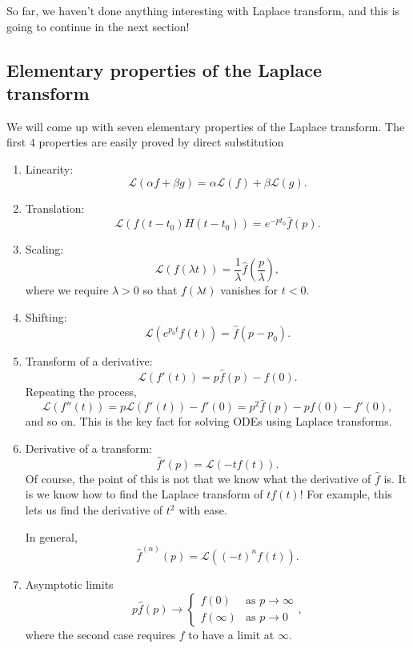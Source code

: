 \documentclass[a4paper]{article}
\begin{document}
So far, we haven't done anything interesting with Laplace transform, and this is going to continue in the next section!
\subsection{Elementary properties of the Laplace transform}
We will come up with seven elementary properties of the Laplace transform. The first $4$ properties are easily proved by direct substitution
\begin{prop}\leavevmode
  \begin{enumerate}
    \item Linearity:
      \[
        \mathcal{L}(\alpha f + \beta g) = \alpha \mathcal{L}(f) + \beta \mathcal{L}(g).
      \]
    \item Translation:
      \[
        \mathcal{L}(f(t - t_0)H(t - t_0)) = e^{-pt_0} \hat{f}(p).
      \]
    \item Scaling:
      \[
        \mathcal{L}(f(\lambda t)) = \frac{1}{\lambda} \hat{f} \left(\frac{p}{\lambda}\right),
      \]
      where we require $\lambda > 0$ so that $f(\lambda t)$ vanishes for $t < 0$.
    \item Shifting:
      \[
        \mathcal{L}(e^{p_0 t}f(t)) = \hat{f}(p - p_0).
      \]
    \item Transform of a derivative:
      \[
        \mathcal{L}(f'(t)) = p \hat{f}(p) - f(0).
      \]
      Repeating the process,
      \[
        \mathcal{L}(f''(t)) = p \mathcal{L}(f'(t)) - f'(0) = p^2 \hat{f}(p) - p f(0) - f'(0),
      \]
      and so on. This is the key fact for solving ODEs using Laplace transforms.
    \item Derivative of a transform:
      \[
        \hat{f}'(p) = \mathcal{L}(-tf(t)).
      \]
      Of course, the point of this is not that we know what the derivative of $\hat{f}$ is. It is we know how to find the Laplace transform of $tf(t)$! For example, this lets us find the derivative of $t^2$ with ease.

      In general,
      \[
        \hat{f}^{(n)} (p) = \mathcal{L}((-t)^n f(t)).
      \]
    \item Asymptotic limits
      \[
        p\hat{f}(p) \to
        \begin{cases}
          f(0) & \text{as }p \to \infty\\
          f(\infty) & \text{as }p \to 0
        \end{cases},
      \]
      where the second case requires $f$ to have a limit at $\infty$.
  \end{enumerate}
\end{prop}
\end{document}
